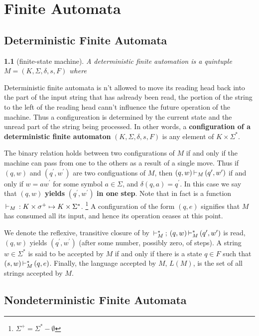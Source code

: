 \chapter{Finite Automata}

\section{Deterministic Finite Automata}

\newtheorem{deterministic_finite_state_machine}[theorem_root]{}

\begin{deterministic_finite_state_machine}[finite-state machine]
A deterministic finite automation is a quintuple $M = (K,\Sigma, \delta, s, F)$ where\newline
\hbox{\quad{}}
\end{deterministic_finite_state_machine}

Deterministic finite automata is n't allowed to move its reading head back into 
the part of the input string that has aslready been read, the portion of the 
string to the left of the reading head cann't influence the future operation of 
the machine. Thus a configureation is determined by the current state and the 
unread part of the string being processed. In other words, a {\bf configuration of a deterministic
finite automaton} $(K, \Sigma, \delta, s, F)$ is any element of $K\times\Sigma^\ast$.

The binary relation \sto holds between two configurations of $M$ if and only if
the machine can pass from one to the others as a result of a single move.
Thus if $(q, w)$ and $(q^\prime, w^\prime)$ are two configuations of $M$, then 
$(q, w)\sto (q^\prime, w^\prime)$ if and only if $w = aw^\prime$ for some symbol $a\in\Sigma$, and
$\delta(q, a) = q^\prime$. In this case we say that $(q, w)$ {\bf yields} $(q^\prime, w^\prime)$ {\bf in one step}.
Note that in fact \sto is a function $\sto: K\times\sigma^+\mapsto K\times\Sigma^\ast$.
\footnote{$\Sigma^+ = \Sigma^\ast - \emptyset$} A configuration of the form $(q, e)$ signifies 
that $M$ has consumed all its input, and hence its operation ceases at this point.

We denote the reflexive, transitive closure of \sto by $\stoc$;
$(q, w) \stoc (q^\prime, w^\prime)$ is read, $(q, w)$ yields $(q^\prime, w^\prime)$
(after some number, possibly zero, of steps).
A string $w\in\Sigma^\ast$ is said to be accepted by $M$ if and only if there is a state
$q\in F$ such that $(s, w)\stoc (q, e)$. Finally, the language accepted by $M$, $L(M)$, 
is the set of all strings accepted by $M$. 

\section{Nondeterministic Finite Automata}